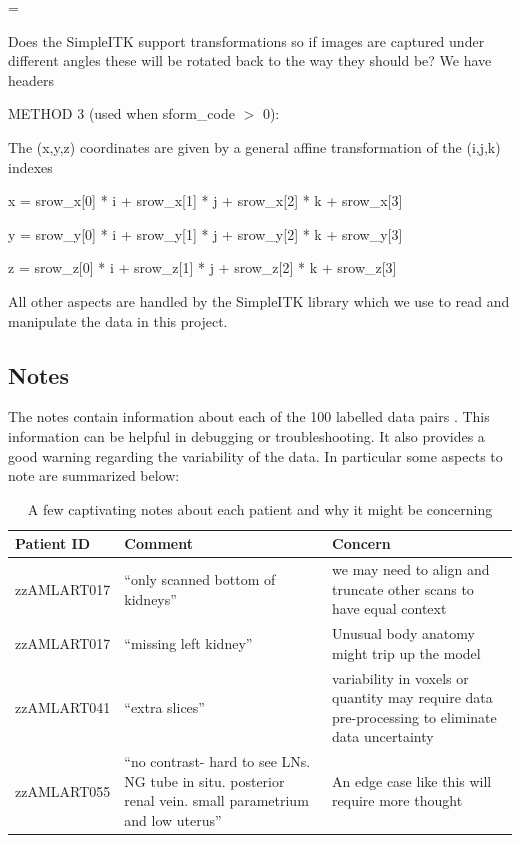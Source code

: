 \documentclass[11pt,twoside]{report}
\newenvironment{warning}
  {\par\begin{mdframed}[linewidth=1pt,linecolor=black]%
    \begin{list}{}{\leftmargin=1cm
                   \labelwidth=\leftmargin}\item[\Large\ding{43}]}
  {\end{list}\end{mdframed}\par}
\begin{document}
\begin{warning}
  Does the SimpleITK support transformations so if images are captured under different angles these will be rotated back to the way they should be? We have headers 

  METHOD 3 (used when sform\_code $>$ 0):
  
  The (x,y,z) coordinates are given by a general affine transformation
  of the (i,j,k) indexes

  x = srow\_x[0] * i + srow\_x[1] * j + srow\_x[2] * k + srow\_x[3]

  y = srow\_y[0] * i + srow\_y[1] * j + srow\_y[2] * k + srow\_y[3]

  z = srow\_z[0] * i + srow\_z[1] * j + srow\_z[2] * k + srow\_z[3]
\end{warning}

All other aspects are handled by the SimpleITK library \cite{SimpleITK-paper} which we use to read and manipulate the data in this project.

\subsection{Notes}\label{sec:data-notes}

The notes contain information about each of the 100 labelled data pairs \cite{AMLART-data}. This information can be helpful in debugging or troubleshooting. It also provides a good warning regarding the variability of the data. In particular some aspects to note are summarized below:

\begin{table}[ht]
  \centering
  \begin{tabular}{>{\raggedright}p{3cm}p{6cm}p{6cm}}
      \toprule
      \textbf{Patient ID} & \textbf{Comment} & \textbf{Concern} \\
      \midrule
      zzAMLART017 & ``only scanned bottom of kidneys'' & we may need to align and truncate other scans to have equal context \\
      zzAMLART017 & ``missing left kidney'' & Unusual body anatomy might trip up the model \\
      zzAMLART041 & ``extra slices'' & variability in voxels or quantity may require data pre-processing to eliminate data uncertainty \\
      zzAMLART055 & ``no contrast- hard to see LNs. NG tube in situ. posterior renal vein. small parametrium and low uterus'' & An edge case like this will require more thought \\
      \bottomrule
  \end{tabular}
  \caption{A few captivating notes about each patient and why it might be concerning}
  \label{tab:notes-summary}
\end{table}
\end{document}
